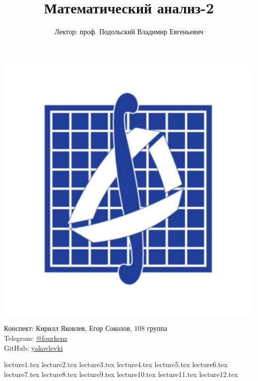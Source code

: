 \documentclass[a4paper, 12pt]{article}
\title{\textbf{Математический анализ-2}}
\author{Лектор: проф. Подольский Владимир Евгеньевич}
\begin{document}
    
\fontsize{14pt}{20pt}\selectfont
\maketitle
\vspace{0.3cm}
\begin{center}
    \includegraphics[width=0.75\linewidth]{Images/mehmat.png}
\end{center}
\vspace{1.5cm}
\begin{center}
    Конспект: Кирилл Яковлев, Егор Соколов, 108 группа\\
    Telegram: \href{https://t.me/fourkenz}{@fourkenz}\\
    GitHub: \href{https://github.com/yakovlevki}{yakovlevki}\\
\end{center}
    
\newpage
\tableofcontents
\newpage

{lecture1.tex}
{lecture2.tex}
{lecture3.tex}
{lecture4.tex}
{lecture5.tex}
{lecture6.tex}
{lecture7.tex}
{lecture8.tex}
{lecture9.tex}
{lecture10.tex}
{lecture11.tex}
{lecture12.tex}
\end{document}

